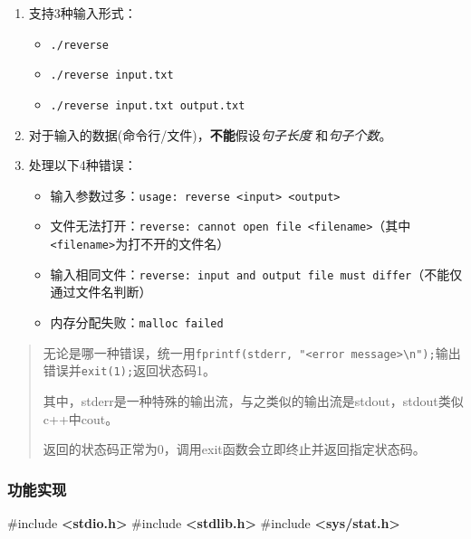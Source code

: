 \documentclass[
]{article}
\newenvironment{Shaded}{}{}
\newcommand{\ImportTok}[1]{\textcolor[rgb]{0.00,0.50,0.00}{\textbf{#1}}}
\newcommand{\PreprocessorTok}[1]{\textcolor[rgb]{0.74,0.48,0.00}{#1}}
\begin{document}
\begin{enumerate}
	\def\labelenumi{\arabic{enumi}.}
	\item
	      支持3种输入形式：

	      \begin{itemize}
		      \item
		            \texttt{./reverse}
		      \item
		            \texttt{./reverse\ input.txt}
		      \item
		            \texttt{./reverse\ input.txt\ output.txt}
	      \end{itemize}
	\item
	      对于输入的数据(命令行/文件)，\textbf{不能}假设\emph{句子长度}
	      和\emph{句子个数}。
	\item
	      处理以下4种错误：

	      \begin{itemize}
		      \item
		            输入参数过多：\texttt{usage:\ reverse\ \textless{}input\textgreater{}\ \textless{}output\textgreater{}}
		      \item
		            文件无法打开：\texttt{reverse:\ cannot\ open\ file\ \textquotesingle{}\textless{}filename\textgreater{}\textquotesingle{}}（其中\texttt{\textless{}filename\textgreater{}}为打不开的文件名）
		      \item
		            输入相同文件：\texttt{reverse:\ input\ and\ output\ file\ must\ differ}（不能仅通过文件名判断）
		      \item
		            内存分配失败：\texttt{malloc\ failed}
	      \end{itemize}
\end{enumerate}

\begin{quote}
	无论是哪一种错误，统一用\texttt{fprintf(stderr,\ "\textless{}error\ message\textgreater{}\textbackslash{}n");}输出错误并\texttt{exit(1);}返回状态码1。

	其中，stderr是一种特殊的输出流，与之类似的输出流是stdout，stdout类似c++中cout。

	返回的状态码正常为0，调用exit函数会立即终止并返回指定状态码。
\end{quote}

\subsubsection{功能实现}\label{ux529fux80fdux5b9eux73b0}

\begin{Shaded}
	\begin{Highlighting}[]
		\PreprocessorTok{\#include }\ImportTok{\textless{}stdio.h\textgreater{}}
		\PreprocessorTok{\#include }\ImportTok{\textless{}stdlib.h\textgreater{}}
		\PreprocessorTok{\#include }\ImportTok{\textless{}sys/stat.h\textgreater{}}
	\end{Highlighting}
\end{Shaded}
\end{document}

